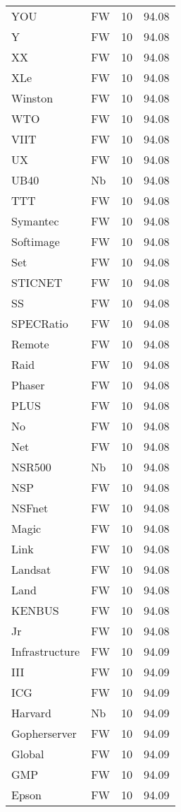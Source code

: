\documentclass[twocolumn]{book}
\begin{document}
\begin{supertabular}{llrr}
YOU & FW & 10 &  94.08\\
Y & FW & 10 &  94.08\\
XX & FW & 10 &  94.08\\
XLe & FW & 10 &  94.08\\
Winston & FW & 10 &  94.08\\
WTO & FW & 10 &  94.08\\
VIIT & FW & 10 &  94.08\\
UX & FW & 10 &  94.08\\
UB40 & Nb & 10 &  94.08\\
TTT & FW & 10 &  94.08\\
Symantec & FW & 10 &  94.08\\
Softimage & FW & 10 &  94.08\\
Set & FW & 10 &  94.08\\
STICNET & FW & 10 &  94.08\\
SS & FW & 10 &  94.08\\
SPECRatio & FW & 10 &  94.08\\
Remote & FW & 10 &  94.08\\
Raid & FW & 10 &  94.08\\
Phaser & FW & 10 &  94.08\\
PLUS & FW & 10 &  94.08\\
No & FW & 10 &  94.08\\
Net & FW & 10 &  94.08\\
NSR500 & Nb & 10 &  94.08\\
NSP & FW & 10 &  94.08\\
NSFnet & FW & 10 &  94.08\\
Magic & FW & 10 &  94.08\\
Link & FW & 10 &  94.08\\
Landsat & FW & 10 &  94.08\\
Land & FW & 10 &  94.08\\
KENBUS & FW & 10 &  94.08\\
Jr & FW & 10 &  94.08\\
Infrastructure & FW & 10 &  94.09\\
III & FW & 10 &  94.09\\
ICG & FW & 10 &  94.09\\
Harvard & Nb & 10 &  94.09\\
Gopherserver & FW & 10 &  94.09\\
Global & FW & 10 &  94.09\\
GMP & FW & 10 &  94.09\\
Epson & FW & 10 &  94.09\\

\end{supertabular}
\end{document}

